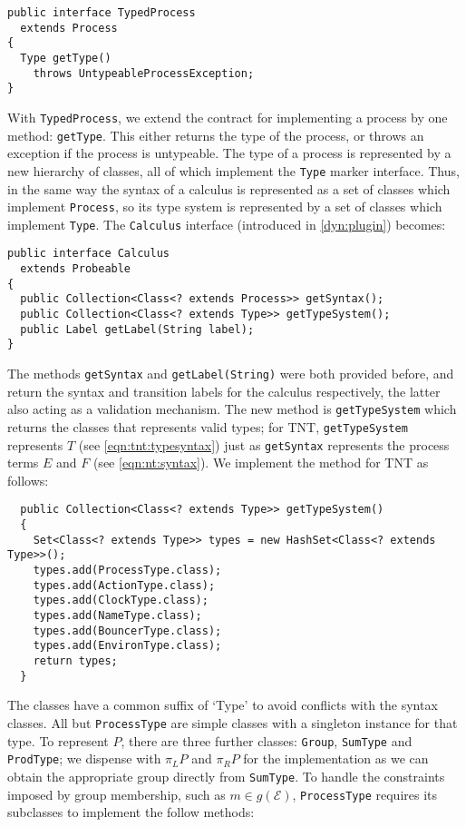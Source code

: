 \begin{verbatim}
public interface TypedProcess
  extends Process
{
  Type getType()
    throws UntypeableProcessException;
}
\end{verbatim}

With \texttt{TypedProcess}, we extend the contract for implementing a
process by one method: \texttt{getType}.  This either returns the type
of the process, or throws an exception if the process is untypeable.
The type of a process is represented by a new hierarchy of classes,
all of which implement the \texttt{Type} marker interface.  Thus, in
the same way the syntax of a calculus is represented as a set of
classes which implement \texttt{Process}, so its type system is
represented by a set of classes which implement \texttt{Type}.  The
\texttt{Calculus} interface (introduced in \ref{dyn:plugin}) becomes:

\begin{verbatim}
public interface Calculus
  extends Probeable
{
  public Collection<Class<? extends Process>> getSyntax();
  public Collection<Class<? extends Type>> getTypeSystem();
  public Label getLabel(String label);
}
\end{verbatim}

The methods \texttt{getSyntax} and \texttt{getLabel(String)} were both
provided before, and return the syntax and transition labels for the
calculus respectively, the latter also acting as a validation
mechanism.  The new method is \texttt{getTypeSystem} which returns the
classes that represents valid types; for TNT, \texttt{getTypeSystem}
represents $T$ (see \ref{eqn:tnt:typesyntax}) just as
\texttt{getSyntax} represents the process terms $E$ and $F$ (see
\ref{eqn:nt:syntax}).  We implement the method for TNT as follows:

\begin{verbatim}
  public Collection<Class<? extends Type>> getTypeSystem()
  {
    Set<Class<? extends Type>> types = new HashSet<Class<? extends Type>>();
    types.add(ProcessType.class);
    types.add(ActionType.class);
    types.add(ClockType.class);
    types.add(NameType.class);
    types.add(BouncerType.class);
    types.add(EnvironType.class);
    return types;
  }
\end{verbatim}

The classes have a common suffix of `Type' to avoid conflicts with the
syntax classes.  All but \texttt{ProcessType} are simple classes with
a singleton instance for that type.  To represent $P$, there are three
further classes: \texttt{Group}, \texttt{SumType} and
\texttt{ProdType}; we dispense with $\pi_L P$ and $\pi_R P$ for the
implementation as we can obtain the appropriate group directly from
\texttt{SumType}.  To handle the constraints imposed by group
membership, such as $m \in g(\mathscr{E})$, \texttt{ProcessType}
requires its subclasses to implement the follow methods:

